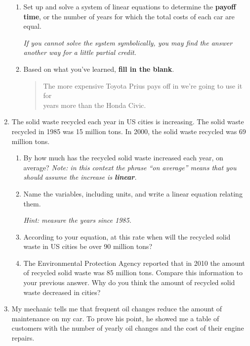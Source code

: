 \documentclass[12pt]{article}
\begin{document}
\begin{enumerate}
\begin{enumerate}
\item Set up and solve a system of linear equations to determine the \textbf{payoff time}, or the number of years for which the total costs of each car are equal.

\emph{If you cannot solve the system symbolically, you may find the answer another way for a little partial credit.}
\vfill

\item Based on what you've learned, \textbf{fill in the blank}.

\begin{quote}
The more expensive Toyota Prius pays off in we're going to use it for \hrulefill   \\
years more than the Honda Civic.  
\end{quote}

\end{enumerate}
\newpage



\item The solid waste recycled each year in US cities is increasing.  The solid waste recycled in 1985 was 15 million tons. In 2000, the solid waste recycled was 69 million tons.  

\begin{enumerate}
\item By how much has the recycled solid waste increased each year, on average?  \emph{Note:  in this context the phrase ``on average'' means that you should assume the increase is \textbf{linear}.}
\vfill
\item Name the variables, including units, and write a linear equation relating them.

\emph{Hint:  measure the years since 1985.}
\vfill
\item According to your equation, at this rate when will the recycled solid waste in US cities be over 90 million tons?
\vfill
\item The Environmental Protection Agency reported that in 2010 the amount of recycled solid waste was 85 million tons.  Compare this information to your previous answer.  Why do you think the amount of recycled solid waste decreased in cities?
\vfill
\end{enumerate}\newpage %

\item My mechanic tells me that frequent oil changes reduce the amount of maintenance on my car.  To prove his point, he showed me a table of customers with the number of yearly oil changes and the cost of their engine repairs.


\end{enumerate}
\end{document}
